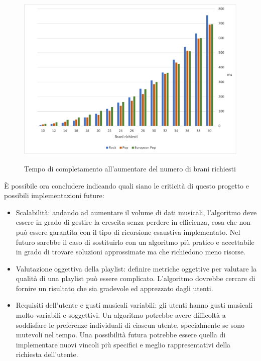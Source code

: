 \documentclass[12pt, a4paper]{article}
\begin{document}
\begin{figure}[h]
\centering
  \includegraphics[scale=0.50]{images/performance}
  \label{performance}
  \caption{Tempo di completamento all'aumentare del numero di brani richiesti}
\end{figure}

È possibile ora concludere indicando quali siano le criticità di questo progetto e possibili implementazioni future:
\begin{itemize}
\item Scalabilità: andando ad aumentare il volume di dati musicali, l'algoritmo deve essere in grado di gestire la crescita senza perdere in efficienza, cosa che non può essere garantita con il tipo di ricorsione esaustiva implementato. Nel futuro sarebbe il caso di sostituirlo con un algoritmo più pratico e accettabile in grado di trovare soluzioni approssimate ma che richiedono meno risorse.
\item Valutazione oggettiva della playlist: definire metriche oggettive per valutare la qualità di una playlist può essere complicato. L'algoritmo dovrebbe cercare di fornire un risultato che sia gradevole ed apprezzato dagli utenti.
\item Requisiti dell'utente e gusti musicali variabili: gli utenti hanno gusti musicali molto variabili e soggettivi. Un algoritmo potrebbe avere difficoltà a soddisfare le preferenze individuali di ciascun utente, specialmente se sono mutevoli nel tempo. Una possibilità futura potrebbe essere quella di implementare nuovi vincoli più specifici e meglio rappresentativi della richiesta dell'utente.
\end{itemize}
\newpage
\end{document}
